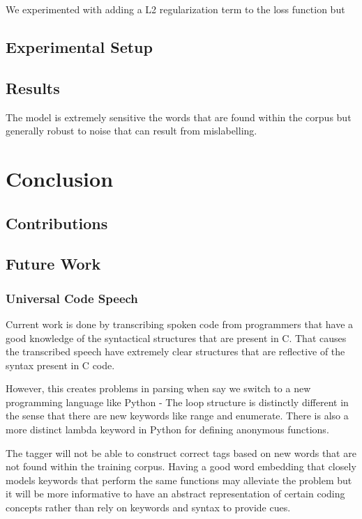 \documentclass[fyp]{socreport}
\begin{document}
We experimented with adding a L2 regularization term to the loss function but


\section{Experimental Setup}

\section{Results}

The model is extremely sensitive the words that are found within the corpus but generally
robust to noise that can result from mislabelling.



\chapter{Conclusion}

\section{Contributions}

\section{Future Work}


\subsection{Universal Code Speech}
Current work is done by transcribing spoken code from programmers that have a
good knowledge of the syntactical structures that are present in C. That causes
the transcribed speech have extremely clear structures that are reflective of
the syntax present in C code.

However, this creates problems in parsing when say we switch to a new
programming language like Python - The loop structure is distinctly different
in the sense that there are new keywords like range and enumerate. There is
also a more distinct lambda keyword in Python for defining anonymous functions.

The tagger will not be able to construct correct tags based on new words that
are not found within the training corpus. Having a good word embedding that
closely models keywords that perform the same functions may alleviate the problem
but it will be more informative to have an abstract representation of certain
coding concepts rather than rely on keywords and syntax to provide cues.
\end{document}
